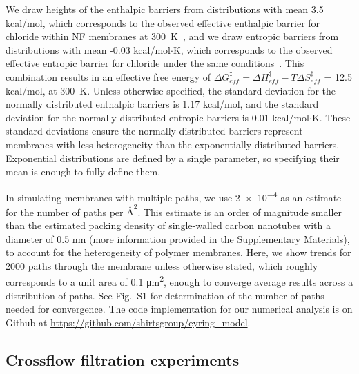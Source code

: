 \documentclass[12pt]{article}
\begin{document}
We draw heights of the enthalpic barriers from distributions with mean 3.5 kcal/mol, which corresponds to the observed effective enthalpic barrier for chloride within NF membranes at 300~K~\cite{pavluchkov_indications_2022}, and we draw entropic barriers from distributions with mean -0.03 kcal/mol$\cdot$K, which corresponds to the observed effective entropic barrier for chloride under the same conditions~\cite{pavluchkov_indications_2022}. This combination results in an effective free energy of $\Delta G_{eff}^{\ddag} = \Delta H_{eff}^{\ddag} - T \Delta S_{eff}^{\ddag}$ = 12.5 kcal/mol, at 300~K. Unless otherwise specified, the standard deviation for the normally distributed enthalpic barriers is 1.17 kcal/mol, and the standard deviation for the normally distributed entropic barriers is 0.01 kcal/mol$\cdot$K. These standard deviations ensure the normally distributed barriers represent membranes with less heterogeneity than the exponentially distributed barriers. Exponential distributions are defined by a single parameter, so specifying their mean is enough to fully define them.

In simulating membranes with multiple paths, we use \num{2e-4} as an estimate for the number of paths per $\text{\AA}^2$. This estimate is an order of magnitude smaller than the estimated packing density of single-walled carbon nanotubes with a diameter of 0.5 nm (more information provided in the Supplementary Materials), to account for the heterogeneity of polymer membranes. Here, we show trends for 2000 paths through the membrane unless otherwise stated, which roughly corresponds to a unit area of 0.1 \unit{\um\squared}, enough to converge average results across a distribution of paths. See Fig.~S1 for determination of the number of paths needed for convergence. The code implementation for our numerical analysis is on Github at \url{https://github.com/shirtsgroup/eyring_model}. 

\subsection*{Crossflow filtration experiments}
\end{document}
